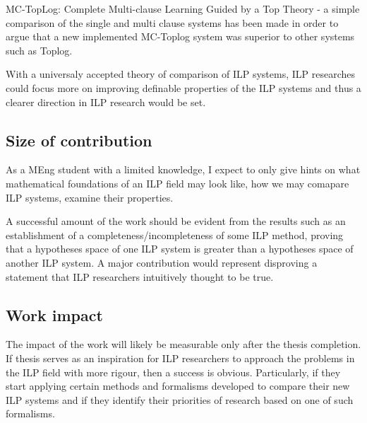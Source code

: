 MC-TopLog: Complete Multi-clause Learning Guided by a Top Theory - a simple comparison of the single and multi clause systems has been made in order to argue that a new implemented MC-Toplog system was superior to other systems such as Toplog.

With a universaly accepted theory of comparison of ILP systems, ILP researches could focus more on improving definable properties of the ILP systems and thus a clearer direction in ILP research would be set.

\subsection{Size of contribution}
As a MEng student with a limited knowledge, I expect to only give hints on what mathematical foundations of an ILP field may look like, how we may comapare ILP systems, examine their properties.

A successful amount of the work should be evident from the results such as an establishment of a completeness/incompleteness of some ILP method, proving that a hypotheses space of one ILP system is greater than a hypotheses space of another ILP system. A major contribution would represent disproving a statement that ILP researchers intuitively thought to be true.

\subsection{Work impact}
The impact of the work will likely be measurable only after the thesis completion. If thesis serves as an inspiration for ILP researchers to approach the problems in the ILP field with more rigour, then a success is obvious. Particularly, if they start applying certain methods and formalisms developed to compare their new ILP systems and if they identify their priorities of research based on one of such formalisms.